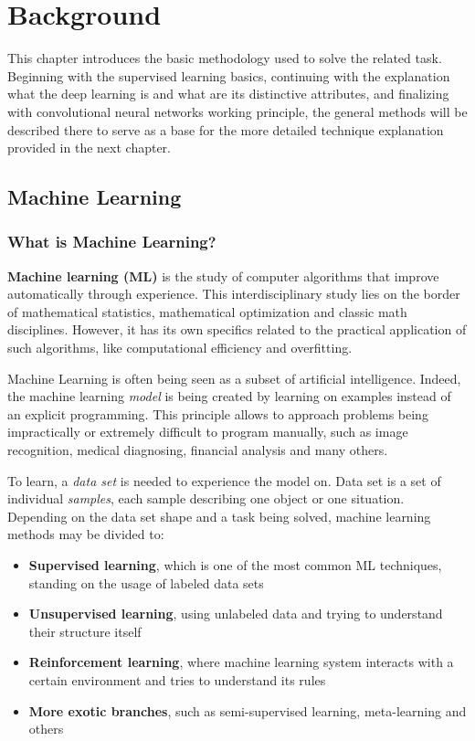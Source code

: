 \documentclass[thesis=B,english]{FITthesis}[2019/12/23]
\begin{document}
	\chapter{Background}
	
	This chapter introduces the basic methodology used to solve the related task. Beginning with the supervised learning basics, continuing with the explanation what the deep learning is and what are its distinctive attributes, and finalizing with convolutional neural networks working principle, the general methods will be described there to serve as a base for the more detailed technique explanation provided in the next chapter.
	
	\section{Machine Learning}
	
	\subsection{What is Machine Learning?}
	
	\textbf{Machine learning (ML)} is the study of computer algorithms that improve automatically through experience\cite{machine_learning}. This interdisciplinary study lies on the border of mathematical statistics, mathematical optimization and classic math disciplines. However, it has its own specifics related to the practical application of such algorithms, like computational efficiency and overfitting.
	
	Machine Learning is often being seen as a subset of artificial intelligence. Indeed, the machine learning \textit{model} is being created by learning on examples instead of an explicit programming. This principle allows to approach problems being impractically or extremely difficult to program manually, such as image recognition, medical diagnosing, financial analysis and many others.
	
	To learn, a \textit{data set} is needed to experience the model on. Data set is a set of individual \textit{samples}, each sample describing one object or one situation. Depending on the data set shape and a task being solved, machine learning methods may be divided to:
	\begin{itemize}
		\item \textbf{Supervised learning}, which is one of the most common ML techniques, standing on the usage of labeled data sets
		\item \textbf{Unsupervised learning}, using unlabeled data and trying to understand their structure itself
		\item \textbf{Reinforcement learning}, where machine learning system interacts with a certain environment and tries to understand its rules
		\item \textbf{More exotic branches}, such as semi-supervised learning, meta-learning and others
	\end{itemize}
	
\end{document}
